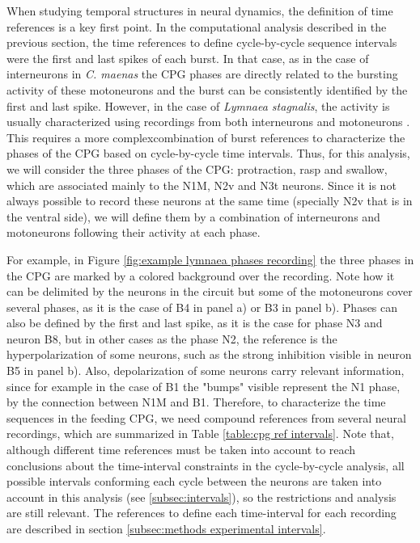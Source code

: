 When studying temporal structures in neural dynamics, the definition of time references is a key first point. In the computational analysis described in the previous section, the time references to define cycle-by-cycle sequence intervals were the first and last spikes of each burst. In that case, as in the case of interneurons in \textit{C. maenas} the CPG phases are directly related to the bursting activity of these motoneurons and the burst can be consistently identified by the first and last spike. However, in the case of \textit{Lymnaea stagnalis}, the activity is usually characterized using recordings from both interneurons and motoneurons \parencite{elliott_interactions_1985, staras_pattern-generating_1998, benjamin_distributed_2012}. This requires a more complexcombination of burst references to characterize the phases of the CPG based on cycle-by-cycle time intervals. Thus, for this analysis, we will consider the three phases of the CPG: protraction, rasp and swallow, which are associated mainly to the N1M, N2v and N3t neurons. Since it is not always possible to record these neurons at the same time (specially N2v that is in the ventral side), we will define them by a combination of interneurons and motoneurons following their activity at each phase. 

For example, in Figure \ref{fig:example lymnaea phases recording} the three phases in the  CPG are marked by a colored background over the recording.  Note how it can be delimited by the neurons in the circuit but some of the motoneurons cover several phases, as it is the case of B4 in panel a) or B3 in panel b). Phases can also be defined by the first and last spike, as it is the case for phase N3 and neuron B8, but in other cases as the phase N2, the reference is the hyperpolarization of some neurons, such as the strong inhibition visible in neuron B5 in panel b). Also, depolarization of some neurons carry relevant information, since for example in the case of B1 the "bumps" visible represent the N1 phase, by the connection between N1M and B1. Therefore, to characterize the time sequences in the feeding CPG, we need compound references from several neural recordings, which are summarized in Table \ref{table:cpg ref intervals}. Note that, although different time references must be taken into account to reach conclusions about the time-interval constraints in the cycle-by-cycle analysis, all possible intervals conforming each cycle between the neurons are taken into account in this analysis (see \ref{subsec:intervals}), so the restrictions and analysis are still relevant. The references to define each time-interval for each recording are described in section \ref{subsec:methods experimental intervals}.


